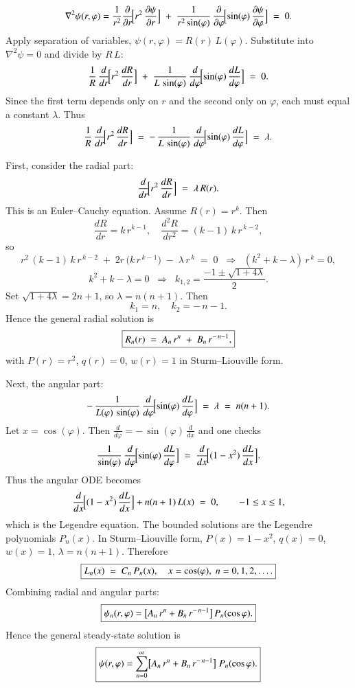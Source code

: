 \documentclass{report}
\begin{document}
\[
\nabla^{2}\psi(r,\varphi)
=
\frac{1}{r^{2}}\frac{\partial}{\partial r}\!\Bigl[r^{2}\,\frac{\partial \psi}{\partial r}\Bigr]
\;+\;
\frac{1}{r^{2}\sin(\varphi)}\,\frac{\partial}{\partial \varphi}\!\Bigl[\sin(\varphi)\,\frac{\partial \psi}{\partial \varphi}\Bigr]
\;=\;0.
\]
Apply separation of variables, \(\psi(r,\varphi) = R(r)\,L(\varphi)\).  Substitute into \(\nabla^{2}\psi=0\) and divide by \(R\,L\):
\[
\frac{1}{R}\,\frac{d}{dr}\!\Bigl[r^{2}\,\frac{dR}{dr}\Bigr]
\;+\;
\frac{1}{L\,\sin(\varphi)}\,\frac{d}{d\varphi}\!\Bigl[\sin(\varphi)\,\frac{dL}{d\varphi}\Bigr]
\;=\;0.
\]
Since the first term depends only on \(r\) and the second only on \(\varphi\), each must equal a constant \(\lambda\).  Thus
\[
\frac{1}{R}\,\frac{d}{dr}\!\Bigl[r^{2}\,\frac{dR}{dr}\Bigr]
\;=\;
-\,\frac{1}{L\,\sin(\varphi)}\,\frac{d}{d\varphi}\!\Bigl[\sin(\varphi)\,\frac{dL}{d\varphi}\Bigr]
\;=\;\lambda.
\]

First, consider the radial part:
\[
\frac{d}{dr}\!\Bigl[r^{2}\,\frac{dR}{dr}\Bigr] \;=\; \lambda\,R(r).
\]
This is an Euler–Cauchy equation.  Assume \(R(r) = r^{k}\).  Then
\[
\frac{dR}{dr} = k\,r^{k-1}, 
\quad
\frac{d^{2}R}{dr^{2}} = (k-1)\,k\,r^{\,k-2},
\]
so
\[
r^{2}\,(k-1)\,k\,r^{\,k-2} \;+\; 2r\,\bigl(k\,r^{\,k-1}\bigr) \;-\; \lambda\,r^{\,k} \;=\; 0
\;\;\Longrightarrow\;\;
(k^{2} + k - \lambda)\,r^{\,k} = 0,
\]
\[
k^{2} + k - \lambda = 0 
\;\;\Longrightarrow\;\;
k_{1,2} = \frac{-1 \pm \sqrt{1 + 4\lambda}}{2}.
\]
Set \(\sqrt{1 + 4\lambda} = 2n + 1\), so \(\lambda = n(n+1)\).  Then
\[
k_{1} = n,\quad
k_{2} = -\,n - 1.
\]
Hence the general radial solution is
\[
\boxed{%
R_{n}(r) \;=\; A_{n}\,r^{n} \;+\; B_{n}\,r^{-\,n-1},%
}
\]
with \(P(r)=r^{2}\), \(q(r)=0\), \(w(r)=1\) in Sturm–Liouville form.

Next, the angular part:
\[
-\,\frac{1}{L(\varphi)\,\sin(\varphi)}\,
\frac{d}{d\varphi}\!\Bigl[\sin(\varphi)\,\frac{dL}{d\varphi}\Bigr]
\;=\;\lambda \;=\; n(n+1).
\]
Let \(x = \cos(\varphi)\).  Then 
\(\frac{d}{d\varphi} = -\,\sin(\varphi)\,\frac{d}{dx}\) and one checks
\[
\frac{1}{\sin(\varphi)}\,\frac{d}{d\varphi}\!\Bigl[\sin(\varphi)\,\frac{dL}{d\varphi}\Bigr]
\;=\;
\frac{d}{dx}\!\Bigl[(1 - x^{2})\,\frac{dL}{dx}\Bigr].
\]
Thus the angular ODE becomes
\[
\frac{d}{dx}\!\Bigl[(1 - x^{2})\,\frac{dL}{dx}\Bigr] + n(n+1)\,L(x) \;=\; 0,
\qquad -1 \le x \le 1,
\]
which is the Legendre equation.  The bounded solutions are the Legendre polynomials \(P_{n}(x)\).  In Sturm–Liouville form, \(P(x)=1 - x^{2}\), \(q(x)=0\), \(w(x)=1\), \(\lambda=n(n+1)\).  Therefore
\[
\boxed{%
L_{n}(x) \;=\; C_{n}\,P_{n}(x), 
\quad x = \cos(\varphi),\;n=0,1,2,\dots.
}
\]
Combining radial and angular parts:
\[
\boxed{%
\psi_{n}(r,\varphi)
= \bigl[A_{n}\,r^{n} + B_{n}\,r^{-\,n-1}\bigr]\,P_{n}(\cos\varphi).
}
\]
Hence the general steady‐state solution is
\[
\boxed{%
\psi(r,\varphi)
= 
\sum_{n=0}^{\infty}
\bigl[A_{n}\,r^{n} + B_{n}\,r^{-\,n-1}\bigr]\;P_{n}(\cos\varphi).
}
\]
\end{document}
